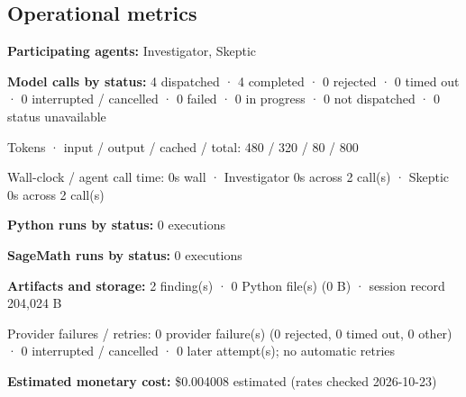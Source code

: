 \documentclass[11pt]{article}
\begin{document}
\subsection{Operational metrics}
\textbf{Participating agents:} Investigator, Skeptic\par
\textbf{Model calls by status:} 4 dispatched · 4 completed · 0 rejected · 0 timed out · 0 interrupted / cancelled · 0 failed · 0 in progress · 0 not dispatched · 0 status unavailable\par
Tokens · input / output / cached / total: 480 / 320 / 80 / 800\par
Wall-clock / agent call time: 0s wall · Investigator 0s across 2 call(s) · Skeptic 0s across 2 call(s)\par
\textbf{Python runs by status:} 0 executions\par
\textbf{SageMath runs by status:} 0 executions\par
\textbf{Artifacts and storage:} 2 finding(s) · 0 Python file(s) (0 B) · session record 204,024 B\par
Provider failures / retries: 0 provider failure(s) (0 rejected, 0 timed out, 0 other) · 0 interrupted / cancelled · 0 later attempt(s); no automatic retries\par
\textbf{Estimated monetary cost:} \$0.004008 estimated (rates checked 2026-10-23)\par
\end{document}
